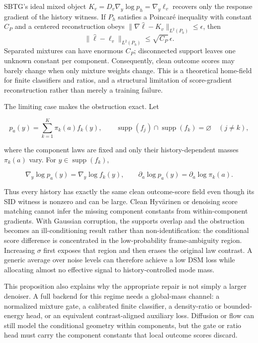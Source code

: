 \documentclass[10pt]{article}
\begin{document}
SBTG's ideal mixed object $K_v=D_v\nabla_y\log p_h=\nabla_y\ell_v$ recovers
only the response gradient of the history witness.  If $P_h$ satisfies a
Poincar\'e inequality with constant $C_P$ and a centered reconstruction obeys
$\|\nabla\widehat\ell-K_v\|_{L^2(P_h)}\leq\epsilon$, then
\[
 \|\widehat\ell-\ell_v\|_{L^2(P_h)}\leq\sqrt{C_P}\,\epsilon.
\]
Separated mixtures can have enormous $C_P$; disconnected support leaves one
unknown constant per component.  Consequently, clean outcome scores may barely
change when only mixture weights change.  This is a theoretical home-field for
finite classifiers and ratios, and a structural limitation of score-gradient
reconstruction rather than merely a training failure.

The limiting case makes the obstruction exact.  Let

\[
 p_a(y)=\sum_{k=1}^K\pi_k(a)f_k(y),
 \qquad \operatorname{supp}(f_j)\cap\operatorname{supp}(f_k)=\varnothing
 \quad(j\ne k),
\]

where the component laws are fixed and only their history-dependent masses
$\pi_k(a)$ vary.  For $y\in\operatorname{supp}(f_k)$,

\[
 \nabla_y\log p_a(y)=\nabla_y\log f_k(y),
 \qquad
 \partial_a\log p_a(y)=\partial_a\log\pi_k(a).
\]

Thus every history has exactly the same clean outcome-score field even though
its SID witness is nonzero and can be large.  Clean Hyv\"arinen or denoising
score matching cannot infer the missing component constants from within-component
gradients.  With Gaussian corruption, the supports overlap and the obstruction
becomes an ill-conditioning result rather than non-identification: the conditional
score difference is concentrated in the low-probability frame-ambiguity region.
Increasing $\sigma$ first exposes that region and then erases the original law
contrast.  A generic average over noise levels can therefore achieve a low DSM
loss while allocating almost no effective signal to history-controlled mode
mass.

This proposition also explains why the appropriate repair is not simply a larger
denoiser.  A full backend for this regime needs a global-mass channel: a normalized
mixture gate, a calibrated finite classifier, a density-ratio or bounded-energy
head, or an equivalent contrast-aligned auxiliary loss.  Diffusion or flow can
still model the conditional geometry within components, but the gate or ratio
head must carry the component constants that local outcome scores discard.
\end{document}
